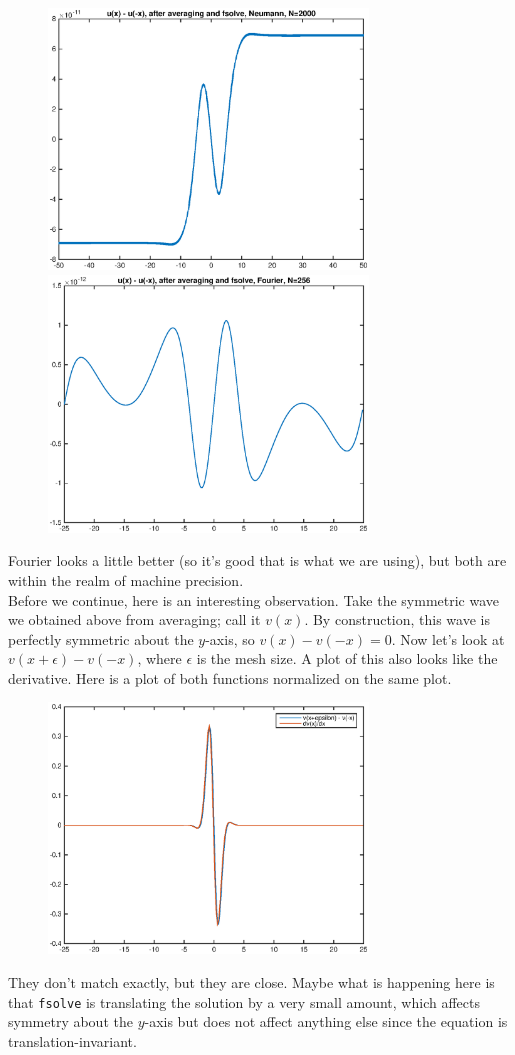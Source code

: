 \documentclass[12pt]{article}
\begin{document}
\begin{figure}[H]
\includegraphics[width=8.5cm]{0singleflipdiffneumannavgfsolve}
\includegraphics[width=8.5cm]{0singleflipdifffourieravgfsolve}
\end{figure}

Fourier looks a little better (so it's good that is what we are using), but both are within the realm of machine precision. \\

Before we continue, here is an interesting observation. Take the symmetric wave we obtained above from averaging; call it $v(x)$. By construction, this wave is perfectly symmetric about the $y$-axis, so $v(x) - v(-x) = 0$. Now let's look at $v(x+\epsilon) - v(-x)$, where $\epsilon$ is the mesh size. A plot of this also looks like the derivative. Here is a plot of both functions normalized on the same plot.
\begin{figure}[H]
\includegraphics[width=8.5cm]{offsetflipdiff}
\end{figure}
They don't match exactly, but they are close. Maybe what is happening here is that \texttt{fsolve} is translating the solution by a very small amount, which affects symmetry about the $y$-axis but does not affect anything else since the equation is translation-invariant.\\
\end{document}

